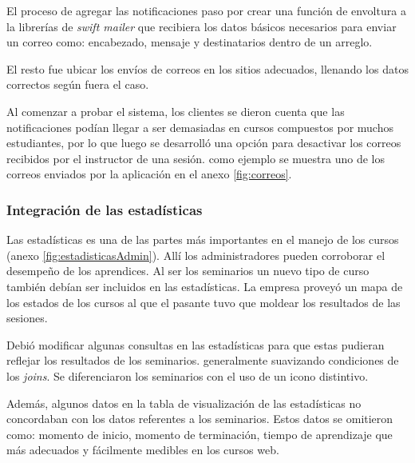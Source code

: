 El proceso de agregar las notificaciones paso por crear una función de envoltura a la librerías de \emph{swift mailer} que recibiera los datos básicos necesarios para enviar un correo como: encabezado, mensaje y destinatarios dentro de un arreglo.

El resto fue ubicar los envíos de correos en los sitios adecuados, llenando los datos correctos según fuera el caso.

Al comenzar a probar el sistema, los clientes se dieron cuenta que las notificaciones podían llegar a ser demasiadas en cursos compuestos por muchos estudiantes, por lo que luego se desarrolló una opción para desactivar los correos recibidos por el instructor de una sesión. como ejemplo se muestra uno de los correos enviados por la aplicación en el anexo \ref{fig:correos}.

\subsubsection{Integración de las estadísticas}

Las estadísticas es una de las partes más importantes en el manejo de los cursos (anexo \ref{fig:estadisticasAdmin}). Allí los administradores pueden corroborar el desempeño de los aprendices. Al ser los seminarios un nuevo tipo de curso también debían ser incluidos en las estadísticas. La empresa proveyó un mapa de los estados de los cursos al que el pasante tuvo que moldear los resultados de las sesiones. 

Debió modificar algunas consultas en las estadísticas para que estas pudieran reflejar los resultados de los seminarios. generalmente suavizando condiciones de los \emph{joins}. Se diferenciaron los seminarios con el uso de un icono distintivo.

Además, algunos datos en la tabla de visualización de las estadísticas no concordaban con los datos referentes a los seminarios. Estos datos se omitieron como: momento de inicio, momento de terminación, tiempo de aprendizaje que más adecuados y fácilmente medibles en los cursos web.


